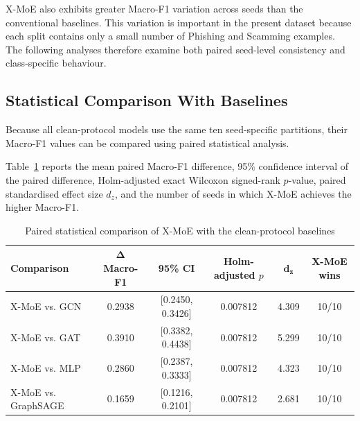\documentclass{ieeeaccess}
\begin{document}
X-MoE also exhibits greater Macro-F1 variation across seeds than the conventional baselines. This variation is important in the present dataset because each split contains only a small number of Phishing and Scamming examples. The following analyses therefore examine both paired seed-level consistency and class-specific behaviour.


\subsection{Statistical Comparison With Baselines}

Because all clean-protocol models use the same ten seed-specific partitions, their Macro-F1 values can be compared using paired statistical analysis.

Table~\ref{tab:clean_statistical_results} reports the mean paired Macro-F1 difference, 95\% confidence interval of the paired difference, Holm-adjusted exact Wilcoxon signed-rank \(p\)-value, paired standardised effect size \(d_z\), and the number of seeds in which X-MoE achieves the higher Macro-F1.

\begin{table}[t]
\centering
\caption{Paired statistical comparison of X-MoE with the clean-protocol baselines}
\label{tab:clean_statistical_results}

\renewcommand{\arraystretch}{1.12}
\setlength{\tabcolsep}{5pt}
\scriptsize

\begin{tabular}{lccccc}
\toprule
\textbf{Comparison} &
\(\boldsymbol{\Delta}\) \textbf{Macro-F1} &
\textbf{95\% CI} &
\textbf{Holm-adjusted \(p\)} &
\(\boldsymbol{d_z}\) &
\textbf{X-MoE wins} \\
\midrule

X-MoE vs. GCN &
0.2938 &
[0.2450, 0.3426] &
0.007812 &
4.309 &
10/10 \\

X-MoE vs. GAT &
0.3910 &
[0.3382, 0.4438] &
0.007812 &
5.299 &
10/10 \\

X-MoE vs. MLP &
0.2860 &
[0.2387, 0.3333] &
0.007812 &
4.323 &
10/10 \\

X-MoE vs. GraphSAGE &
0.1659 &
[0.1216, 0.2101] &
0.007812 &
2.681 &
10/10 \\

\bottomrule
\end{tabular}
\end{table}
\end{document}
